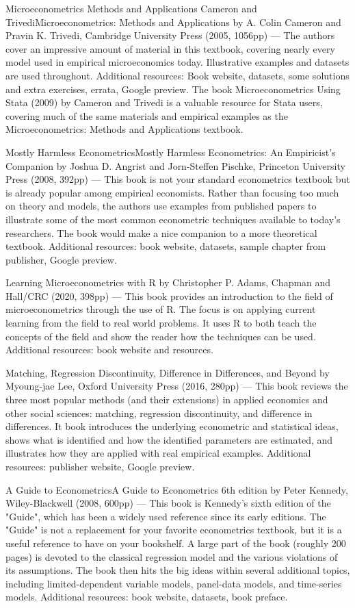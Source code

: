 Microeconometrics Methods and Applications Cameron and TrivediMicroeconometrics: Methods and Applications by A. Colin Cameron and Pravin K. Trivedi, Cambridge University Press (2005, 1056pp) --- The authors cover an impressive amount of material in this textbook, covering nearly every model used in empirical microeconomics today.  Illustrative examples and datasets are used throughout.  Additional resources:  Book website, datasets, some solutions and extra exercises, errata, Google preview.  The book Microeconometrics Using Stata (2009) by Cameron and Trivedi is a valuable resource for Stata users, covering much of the same materials and empirical examples as the Microeconometrics: Methods and Applications textbook.

Mostly Harmless EconometricsMostly Harmless Econometrics: An Empiricist's Companion by Joshua D. Angrist and Jorn-Steffen Pischke, Princeton University Press (2008, 392pp) --- This book is not your standard econometrics textbook but is already popular among empirical economists.  Rather than focusing too much on theory and models, the authors use examples from published papers to illustrate some of the most common econometric techniques available to today's researchers.  The book would make a nice companion to a more theoretical textbook.  Additional resources:  book website, datasets, sample chapter from publisher, Google preview.

Learning Microeconometrics with R by Christopher P. Adams, Chapman and Hall/CRC (2020, 398pp) --- This book provides an introduction to the field of microeconometrics through the use of R. The focus is on applying current learning from the field to real world problems. It uses R to both teach the concepts of the field and show the reader how the techniques can be used.   Additional resources:  book website and resources.

Matching, Regression Discontinuity, Difference in Differences, and Beyond by Myoung-jae Lee, Oxford University Press (2016, 280pp) --- This book reviews the three most popular methods (and their extensions) in applied economics and other social sciences: matching, regression discontinuity, and difference in differences.   It book introduces the underlying econometric and statistical ideas, shows what is identified and how the identified parameters are estimated, and illustrates how they are applied with real empirical examples.   Additional resources:  publisher website, Google preview.

A Guide to EconometricsA Guide to Econometrics 6th edition by Peter Kennedy, Wiley-Blackwell (2008, 600pp) --- This book is Kennedy's sixth edition of the "Guide", which has been a widely used reference since its early editions.  The "Guide" is not a replacement for your favorite econometrics textbook, but it is a useful reference to have on your bookshelf.  A large part of the book (roughly 200 pages) is devoted to the classical regression model and the various violations of its assumptions.  The book then hits the big ideas within several additional topics, including limited-dependent variable models, panel-data models, and time-series models.  Additional resources:  book website, datasets, book preface.

